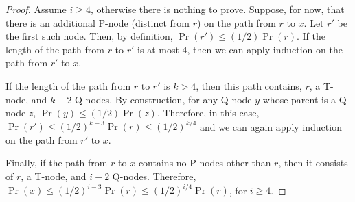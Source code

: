 \documentclass[acmtalg]{acmsmall}
\newcommand{\prnt}{\mathrm{parent}}
\begin{document}
\begin{proof}
Assume $i\ge 4$, otherwise there is nothing to prove. 
Suppose, for now, that there is an additional P-node (distinct from $r$)
on the path from $r$ to $x$.  Let $r'$ be the first such node.  Then, by
definition, $\Pr(r')\le (1/2)\Pr(r)$. If the length of the path from $r$
to $r'$ is at most 4, then we can apply induction on the path from $r'$
to $x$.  

If the length of the path from $r$ to $r'$ is $k>4$, then this path
contains, $r$, a T-node, and $k-2$ Q-nodes.  By construction, for
any Q-node $y$ whose parent is a Q-node $z$, $\Pr(y)\le(1/2)\Pr(z)$.
Therefore, in this case, $\Pr(r') \le (1/2)^{k-3}\Pr(r)\le (1/2)^{k/4}$
and we can again apply induction on the path from $r'$ to $x$.

Finally, if the path from $r$ to $x$ contains no P-nodes other than
$r$, then it consists of $r$, a T-node, and $i-2$ Q-nodes.  Therefore,
$\Pr(x)\le (1/2)^{i-3}\Pr(r)\le (1/2)^{i/4}\Pr(r)$, for $i\ge 4$.
\end{proof}
%
%
%
\end{document}
